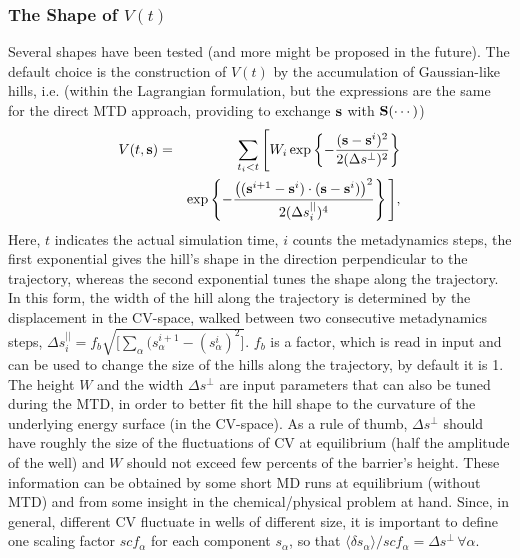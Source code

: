 \documentclass[twoside,10pt,titlepage,a4paper]{article}
\begin{document}
\subsubsection{The Shape of $V(t)$}
Several shapes have been tested (and more might be proposed in the future).
The default choice is the construction of $V(t)$ by the accumulation of
Gaussian-like hills, i.e. (within the Lagrangian formulation, but the
expressions are the same for the direct MTD approach,
providing to exchange $\bf s$ with ${\bf S(\cdots)}$)
\begin{eqnarray}
V(t,{\bf s}) & = & \sum_{t_{i} < t } \Bigg[W_{i}\exp \left \{-
\frac{({\bf s}-{\bf s}^{i})^{2}}{2 (\Delta s^{\perp})^{2}} \right \} \nonumber \\
 & & \exp \left
\{-\frac{\left( ({\bf s}^{i+1}-{\bf s}^{i}) \cdot ({\bf s}-{\bf s}^{i})\right)^{2}}
{2 (\Delta s^{||}_{i})^4} \right\}\Bigg],
\label{eq: hills}
\end{eqnarray}
Here, $t$ indicates the actual simulation time, $i$ counts the metadynamics steps,
the first exponential gives the hill's shape in the direction perpendicular
to the trajectory, whereas the second exponential tunes the shape along the trajectory.
In this form, the width of the hill along the trajectory is determined by
the displacement in the CV-space, walked between two consecutive metadynamics
steps, $\Delta s^{||}_{i} = f_{b}\sqrt{\Big[\sum_{\alpha}(s_{\alpha}^{i+1}-(s_{\alpha}^{i})^2\Big]}$.
$f_b$ is a factor, which is read in input and can be used to change the
size of the hills along the trajectory, by default it is 1.
The height $W$ and the width $ \Delta s^{\perp}$ are input parameters that can
also be tuned during the MTD, in order to better fit the hill shape to the
curvature of the underlying energy surface (in the CV-space).
As a rule of thumb,  $ \Delta s^{\perp}$  should have roughly the size of the
fluctuations of CV at equilibrium (half the amplitude of the well) and $W$
should not exceed few percents of the barrier's height.
These information can be obtained by some short MD runs at equilibrium
(without MTD) and from some insight in the chemical/physical problem at hand.
Since, in general, different CV fluctuate in wells of different size,
it is important to define one scaling factor  $scf_{\alpha}$ for each component
$s_{\alpha}$, so that
$\langle \delta s_{\alpha}\rangle /scf_{\alpha} = \Delta s^{\perp} \, \forall \alpha$.
\end{document}
